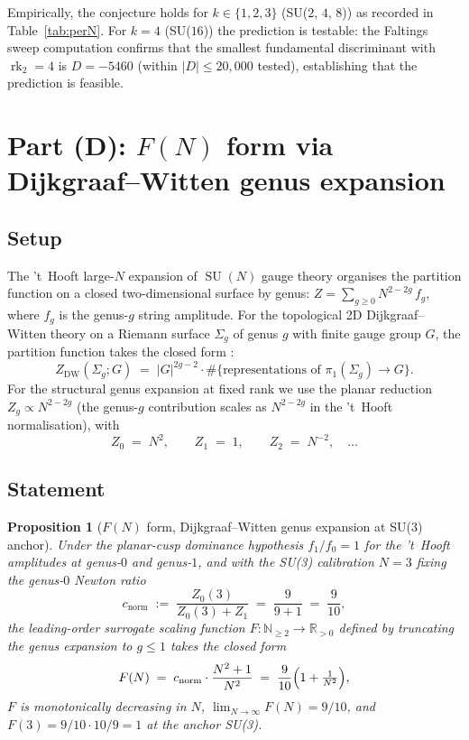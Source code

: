 \documentclass[11pt,a4paper,reqno]{amsart}
\newtheorem{proposition}[theorem]{Proposition}
\theoremstyle{definition}
\DeclareMathOperator{\SU}{SU}
\DeclareMathOperator{\rk}{rk}
\newcommand{\RR}{\mathbb{R}}
\newcommand{\NN}{\mathbb{N}}
\begin{document}
Empirically, the conjecture holds for $k\in\{1,2,3\}$ (SU($2$, $4$, $8$))
as recorded in Table~\ref{tab:perN}.  For $k=4$ (SU($16$)) the prediction is
testable: the Faltings sweep computation \cite{Remondiere2026Faltings}
confirms that the smallest fundamental discriminant with $\rk_2=4$ is
$D=-5460$ (within $|D|\le 20{,}000$ tested), establishing that the
prediction is feasible.

\section{Part (D): $F(N)$ form via Dijkgraaf--Witten genus expansion}\label{sec:FN}

\subsection{Setup}\label{ss:FNsetup}

The 't~Hooft large-$N$ expansion of $\SU(N)$ gauge theory \cite{tHooft1974}
organises the partition function on a closed two-dimensional surface by
genus: $Z = \sum_{g\ge 0} N^{2-2g}\,f_g$, where $f_g$ is the genus-$g$ string
amplitude.  For the topological 2D Dijkgraaf--Witten theory on a Riemann
surface $\Sigma_g$ of genus $g$ with finite gauge group $G$, the partition
function takes the closed form \cite{DijkgraafWitten1990}:
\begin{equation}\label{eq:DW}
   Z_{\mathrm{DW}}(\Sigma_g; G) \;=\; |G|^{2g-2}\cdot \#\{\text{representations of }\pi_1(\Sigma_g)\to G\}.
\end{equation}
For the structural genus expansion at fixed rank we use the planar reduction
$Z_g \propto N^{2-2g}$ (the genus-$g$ contribution scales as $N^{2-2g}$ in
the 't~Hooft normalisation), with
\[
   Z_0 \;=\; N^2, \qquad Z_1 \;=\; 1, \qquad Z_2 \;=\; N^{-2}, \quad\ldots
\]

\subsection{Statement}\label{ss:FNstmt}

\begin{proposition}[$F(N)$ form, Dijkgraaf--Witten genus expansion at SU(3) anchor]\label{prop:FN}
Under the planar-cusp dominance hypothesis $f_1/f_0=1$ for the 't~Hooft
amplitudes at genus-$0$ and genus-$1$, and with the SU(3) calibration
$N=3$ fixing the genus-$0$ Newton ratio
\[
   c_{\mathrm{norm}} \;:=\; \frac{Z_0(3)}{Z_0(3)+Z_1} \;=\; \frac{9}{9+1} \;=\; \frac{9}{10},
\]
the leading-order surrogate scaling function $F:\NN_{\ge 2}\to\RR_{>0}$
defined by truncating the genus expansion to $g\le 1$ takes the closed form
\begin{equation}\label{eq:FN}
   F(N) \;=\; c_{\mathrm{norm}}\cdot\frac{N^2+1}{N^2} \;=\; \frac{9}{10}\Bigl(1 + \tfrac{1}{N^2}\Bigr),
\end{equation}
$F$ is monotonically decreasing in $N$, $\lim_{N\to\infty}F(N) = 9/10$, and
$F(3) = 9/10\cdot 10/9 = 1$ at the anchor SU(3).
\end{proposition}
\end{document}
